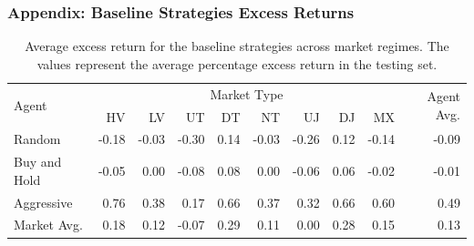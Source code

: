 \documentclass{beamer}
\begin{document}
\begin{frame}
  \frametitle{Appendix: Baseline Strategies Excess Returns}

  \begin{table}[htbp]
    \fontsize{7}{9}\selectfont
    \centering
    \caption[Baseline Strategies Excess Return]{Average excess return for the baseline strategies across market regimes. The values represent the average percentage excess return in the testing set.}
    \begin{tabular}{l|rrrrrrrr|r}
    \hline
    \multirow{2}{*}{Agent} & \multicolumn{8}{c|}{Market Type} & \multirow{2}{*}{Agent Avg.} \\
    \cline{2-9}
    & HV &  LV &  UT &  DT &  NT &  UJ &  DJ & MX \\
    \hline
    Random       &     -0.18 &    -0.03 &     -0.30 &        0.14 &     -0.03 &    -0.26 &       0.12 &  -0.14 &       -0.09 \\
    Buy and Hold &     -0.05 &     0.00 &     -0.08 &        0.08 &      0.00 &    -0.06 &       0.06 &  -0.02 &       -0.01 \\
    Aggressive   &      0.76 &     0.38 &      0.17 &        0.66 &      0.37 &     0.32 &       0.66 &   0.60 &        0.49 \\
    \hline
    Market Avg.  &      0.18 &     0.12 &     -0.07 &        0.29 &      0.11 &     0.00 &       0.28 &   0.15 &        0.13 \\
    \end{tabular}
  \end{table}
\end{frame}
\end{document}
